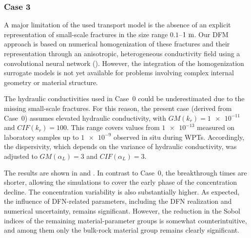 
\FloatBarrier
\subsubsection{Case 3}

A major limitation of the used transport model is the absence of an explicit
representation of small-scale fractures in the size range
$0.1$--$1\,\,\mathrm{m}$.
Our \gls{DFM} approach is based on numerical homogenization of these fractures
and their representation through an anisotropic, heterogeneous conductivity
field using a convolutional neural network
(\cite{Spetlik_Convolutional_2026}). However, the integration of the
homogenization surrogate models is not yet available for problems involving
complex internal geometry or material structure.

The hydraulic conductivities used in Case~0 could be underestimated due to the
missing small-scale fractures. For this reason, the present case
(derived from Case~0) assumes elevated hydraulic conductivity, with
$GM(k_r)=\num{1e-11}$ and $CIF(k_r)=100$. This range covers values from
$\num{1e-13}$ measured on laboratory samples up to $\num{1e-9}$ observed in
situ during \gls{WPT}s. Accordingly, the dispersivity, which depends on the
variance of hydraulic conductivity, was adjusted to $GM(\alpha_L)=3$ and
$CIF(\alpha_L)=3$.

The results are shown in  and
. In contrast to Case~0, the breakthrough times are
shorter, allowing the simulations to cover the early phase of the concentration
decline. The concentration variability is also substantially higher.
As expected, the influence of DFN-related parameters, including the DFN
realization and numerical uncertainty, remains significant. However, the
reduction in the Sobol indices of the remaining material-parameter groups is
somewhat counterintuitive, and among them only the bulk-rock material group
remains clearly significant.

